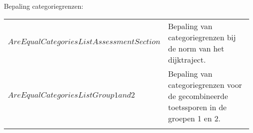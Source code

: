 Bepaling categoriegrenzen:
\begin{longtable}[l]{p{0.5cm} l}
	\endhead
	\T
	$AreEqualCategoriesListAssessmentSection$ & Bepaling van categoriegrenzen bij de norm van het dijktraject. \B \\ \T
	$AreEqualCategoriesListGroup1and2$ & Bepaling van categoriegrenzen voor de gecombineerde toetssporen in de groepen 1 en 2. \B \\ \T
\end{longtable}
